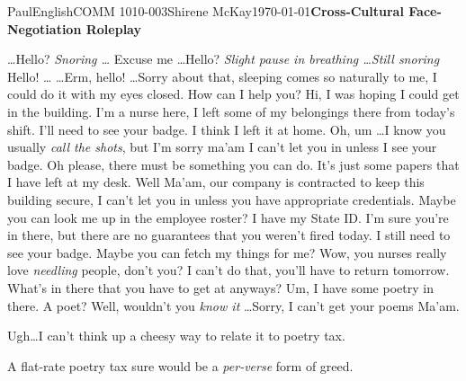 \documentclass[12pt,letterpaper]{article}
\begin{document}
\begin{mla}{Paul}{English}{COMM 1010-003}{Shirene
    McKay}{\today}{\textbf{Cross-Cultural Face-Negotiation Roleplay}}


\scene[]


\begin{drama}

\kiyokospeaks \dots Hello?
\richspeaks \emph{Snoring \dots}
\kiyokospeaks Excuse me \dots Hello?
\richspeaks \emph{Slight pause in breathing \dots Still snoring}
\kiyokospeaks Hello!
\richspeaks \dots
{}
\richspeaks \dots Erm, hello! \dots Sorry about that, sleeping comes so naturally to me, I could do it with my eyes closed. How can I help you?
\kiyokospeaks Hi, I was hoping I could get in the building. I'm a nurse here, I left some of my belongings there from today's shift.
\richspeaks I'll need to see your badge.
\kiyokospeaks I think I left it at home.
\richspeaks Oh, um \dots I know you usually \emph{call the shots}, but I'm sorry ma'am I can't let you in unless I see your badge.
\kiyokospeaks Oh please, there must be something you can do. It's just some papers that I have left at my desk.
\richspeaks Well Ma'am, our company is contracted to keep this building secure, I can't let you in unless you have appropriate credentials.
\kiyokospeaks Maybe you can look me up in the employee roster? I have my State ID.
\richspeaks I'm sure you're in there, but there are no guarantees that you weren't fired today. I still need to see your badge.
\kiyokospeaks Maybe you can fetch my things for me?
\richspeaks Wow, you nurses really love \emph{needling} people, don't you? I can't do that, you'll have to return tomorrow. What's in there that you have to get at anyways?
\kiyokospeaks Um, I have some poetry in there.
\richspeaks A poet? Well, wouldn't you \emph{know it} \dots Sorry, I can't get your poems Ma'am.

\paulspeaks Ugh\dots I can't think up a cheesy way to relate it to poetry tax.

\richspeaks A flat-rate poetry tax sure would be a \emph{per-verse} form of greed.




\end{drama}

\end{mla}
\end{document}
